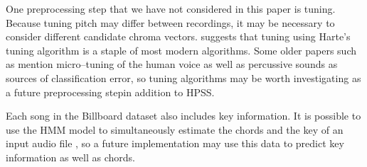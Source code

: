\documentclass{article}
\begin{document}
One preprocessing step that we have not considered in this paper is tuning. Because tuning pitch
may differ between recordings, it may be necessary to consider different candidate chroma vectors.
\cite{McVicar:00} suggests that tuning using Harte's tuning algorithm is a staple of most modern
algorithms. Some older papers such as \cite{Zenz:20} mention micro--tuning of the human voice as well
as percussive sounds as sources of classification error, so tuning algorithms may be worth investigating
as a future preprocessing stepin addition to HPSS.

Each song in the Billboard dataset also includes key information. It is possible to use the HMM model to
simultaneously estimate the chords and the key of an input audio file \cite{McVicar:00}, so a future
implementation may use this data to predict key information as well as chords.
\end{document}
